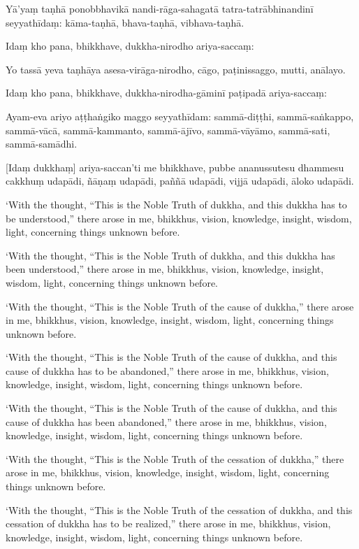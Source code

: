 Yā'yaṃ taṇhā ponobbhavikā nandi-rāga-sahagatā tatra-tatrābhinandinī
seyyathīdaṃ: kāma-taṇhā, bhava-taṇhā, vibhava-taṇhā.

Idaṃ kho pana, bhikkhave, dukkha-nirodho ariya-saccaṃ:

Yo tassā yeva taṇhāya asesa-virāga-nirodho, cāgo, paṭinissaggo, mutti,
anālayo.

Idaṃ kho pana, bhikkhave, dukkha-nirodha-gāminī paṭipadā ariya-saccaṃ:

Ayam-eva ariyo aṭṭhaṅgiko maggo seyyathīdam: sammā-diṭṭhi,
sammā-saṅkappo, sammā-vācā, sammā-kammanto, sammā-ājīvo, sammā-vāyāmo,
sammā-sati, sammā-samādhi.

\enlargethispage{\baselineskip}

[Idaṃ dukkhaṃ] ariya-saccan'ti me bhikkhave, pubbe ananussutesu dhammesu
cakkhuṃ udapādi, ñāṇaṃ udapādi, paññā udapādi, vijjā udapādi, āloko
udapādi.

\clearpage

\englishText
\markboth{\englishTitle}{\rightmark}

‘With the thought, “This is the Noble Truth of dukkha, and this dukkha
has to be understood,” there arose in me, bhikkhus, vision, knowledge,
insight, wisdom, light, concerning things unknown before.

‘With the thought, “This is the Noble Truth of dukkha, and this dukkha
has been understood,” there arose in me, bhikkhus, vision, knowledge,
insight, wisdom, light, concerning things unknown before.

‘With the thought, “This is the Noble Truth of the cause of dukkha,”
there arose in me, bhikkhus, vision, knowledge, insight, wisdom, light,
concerning things unknown before.

‘With the thought, “This is the Noble Truth of the cause of dukkha, and
this cause of dukkha has to be abandoned,” there arose in me, bhikkhus,
vision, knowledge, insight, wisdom, light, concerning things unknown
before.

‘With the thought, “This is the Noble Truth of the cause of dukkha, and
this cause of dukkha has been abandoned,” there arose in me, bhikkhus,
vision, knowledge, insight, wisdom, light, concerning things unknown
before.

‘With the thought, “This is the Noble Truth of the cessation of dukkha,”
there arose in me, bhikkhus, vision, knowledge, insight, wisdom, light,
concerning things unknown before.

‘With the thought, “This is the Noble Truth of the cessation of dukkha,
and this cessation of dukkha has to be realized,” there arose in me,
bhikkhus, vision, knowledge, insight, wisdom, light, concerning things
unknown before.

